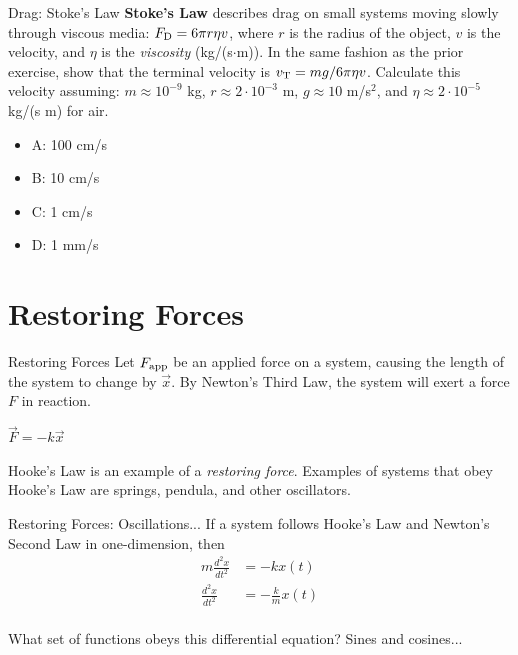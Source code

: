 \documentclass{beamer}
\begin{document}
\begin{frame}{Drag: Stoke's Law}
\small
\alert{\textbf{Stoke's Law}} describes drag on small systems moving slowly through viscous media: $F_{\rm D} = 6\pi r\eta v$, where $r$ is the radius of the object, $v$ is the velocity, and $\eta$ is the \textit{viscosity} (kg/(s$\cdot$m)).  In the same fashion as the prior exercise, show that the terminal velocity is $v_{\rm T} = mg/6\pi\eta v$.  Calculate this velocity assuming: $m\approx 10^{-9}$ kg, $r\approx 2 \cdot 10^{-3}$ m, $g\approx 10$ m/s$^2$, and $\eta \approx 2 \cdot 10^{-5}$ kg/(s m) for air.
\begin{itemize}
\item A: 100 cm/s
\item B: 10 cm/s
\item C: 1 cm/s
\item D: 1 mm/s
\end{itemize}
\end{frame}

\section{Restoring Forces}

\begin{frame}{Restoring Forces}
Let $F_{\rm app}$ be an applied force on a system, causing the length of the system to change by $\vec{x}$.  By Newton's Third Law, the system will exert a force $F$ in reaction. \\
\vspace{1cm}
\begin{tcolorbox}[colback=white,colframe=red!40!blue,title=Hooke's Law]
\alert{$\vec{F} = -k\vec{x}$}
\end{tcolorbox}
\vspace{0.5cm}
Hooke's Law is an example of a \textit{restoring force}.  Examples of systems that obey Hooke's Law are springs, pendula, and other oscillators.
\end{frame}

\begin{frame}{Restoring Forces: Oscillations...}
If a system follows Hooke's Law and Newton's Second Law in one-dimension, then \\
\begin{align}
m \frac{d^2x}{dt^2} &= -k x(t) \label{eq:osc1} \\
\frac{d^2x}{dt^2} &= -\frac{k}{m} x(t) \label{eq:osc2}
\end{align} \\
What set of functions obeys this differential equation?  Sines and cosines...
\end{frame}
\end{document}
